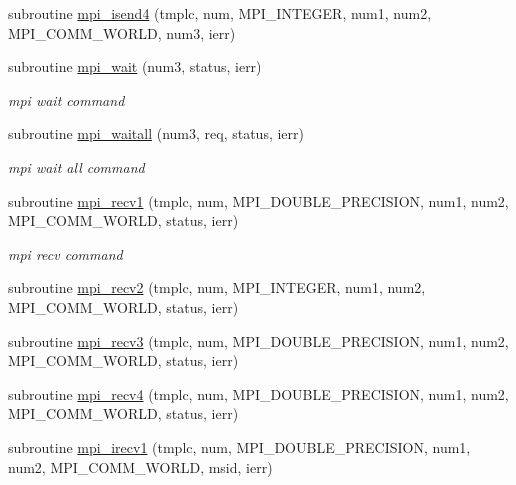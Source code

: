 \begin{DoxyCompactItemize}
\item 
subroutine \mbox{\hyperlink{namespacempistub_a4afba16e08f9475afade41e36b28333c}{mpi\+\_\+isend4}} (tmplc, num, M\+P\+I\+\_\+\+I\+N\+T\+E\+G\+ER, num1, num2, M\+P\+I\+\_\+\+C\+O\+M\+M\+\_\+\+W\+O\+R\+LD, num3, ierr)
\item 
subroutine \mbox{\hyperlink{namespacempistub_abc6e6b54dd8f86227143dffe19e34fa4}{mpi\+\_\+wait}} (num3, status, ierr)
\begin{DoxyCompactList}\small\item\em mpi wait command \end{DoxyCompactList}\item 
subroutine \mbox{\hyperlink{namespacempistub_ae67c78bda40eb1d1e4dbd6c69afc6201}{mpi\+\_\+waitall}} (num3, req, status, ierr)
\begin{DoxyCompactList}\small\item\em mpi wait all command \end{DoxyCompactList}\item 
subroutine \mbox{\hyperlink{namespacempistub_a43bcd6e1779da1802197e44427742c2b}{mpi\+\_\+recv1}} (tmplc, num, M\+P\+I\+\_\+\+D\+O\+U\+B\+L\+E\+\_\+\+P\+R\+E\+C\+I\+S\+I\+ON, num1, num2, M\+P\+I\+\_\+\+C\+O\+M\+M\+\_\+\+W\+O\+R\+LD, status, ierr)
\begin{DoxyCompactList}\small\item\em mpi recv command \end{DoxyCompactList}\item 
subroutine \mbox{\hyperlink{namespacempistub_a9936e4610ebb0c4c17e99d8a6d39e562}{mpi\+\_\+recv2}} (tmplc, num, M\+P\+I\+\_\+\+I\+N\+T\+E\+G\+ER, num1, num2, M\+P\+I\+\_\+\+C\+O\+M\+M\+\_\+\+W\+O\+R\+LD, status, ierr)
\item 
subroutine \mbox{\hyperlink{namespacempistub_a86129a6bb6e924778df9e0c578f838d2}{mpi\+\_\+recv3}} (tmplc, num, M\+P\+I\+\_\+\+D\+O\+U\+B\+L\+E\+\_\+\+P\+R\+E\+C\+I\+S\+I\+ON, num1, num2, M\+P\+I\+\_\+\+C\+O\+M\+M\+\_\+\+W\+O\+R\+LD, status, ierr)
\item 
subroutine \mbox{\hyperlink{namespacempistub_ab6b89c7d5ec60b643e3c939f926430c1}{mpi\+\_\+recv4}} (tmplc, num, M\+P\+I\+\_\+\+D\+O\+U\+B\+L\+E\+\_\+\+P\+R\+E\+C\+I\+S\+I\+ON, num1, num2, M\+P\+I\+\_\+\+C\+O\+M\+M\+\_\+\+W\+O\+R\+LD, status, ierr)
\item 
subroutine \mbox{\hyperlink{namespacempistub_ada728226719e1870c85e45f6594cccbd}{mpi\+\_\+irecv1}} (tmplc, num, M\+P\+I\+\_\+\+D\+O\+U\+B\+L\+E\+\_\+\+P\+R\+E\+C\+I\+S\+I\+ON, num1, num2, M\+P\+I\+\_\+\+C\+O\+M\+M\+\_\+\+W\+O\+R\+LD, msid, ierr)

\end{DoxyCompactItemize}
